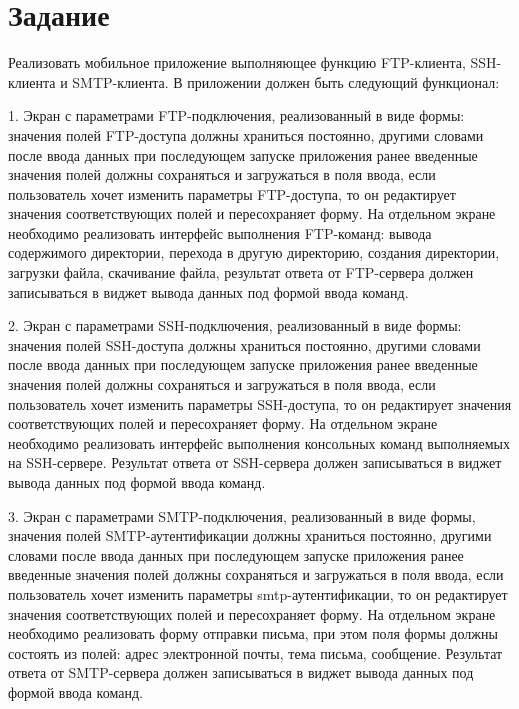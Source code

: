 \documentclass[a4paper, 14pt]{extarticle}
\begin{document}
\renewcommand{\ttdefault}{pcr}

\setlength{\tabcolsep}{3pt}
\newpage
\setcounter{page}{2}

\section{Задание}\label{Sect::task}

Реализовать мобильное приложение выполняющее функцию FTP-клиента,  SSH-клиента и SMTP-клиента.  В приложении должен быть следующий функционал:

1. Экран с параметрами FTP-подключения, реализованный в виде формы: значения полей FTP-доступа должны храниться постоянно, другими словами после ввода данных при последующем запуске приложения ранее введенные значения полей должны сохраняться и загружаться в поля ввода, если пользователь хочет изменить параметры FTP-доступа, то он редактирует значения соответствующих полей и пересохраняет форму. На отдельном экране необходимо реализовать интерфейс выполнения FTP-команд: вывода содержимого директории, перехода в другую директорию, создания директории, загрузки файла, скачивание файла, результат ответа от FTP-сервера должен записываться в виджет вывода данных под формой ввода команд.

2. Экран с параметрами SSH-подключения, реализованный в виде формы: значения полей SSH-доступа должны храниться постоянно, другими словами после ввода данных при последующем запуске приложения ранее введенные значения полей должны сохраняться и загружаться в поля ввода, если пользователь хочет изменить параметры SSH-доступа, то он редактирует значения соответствующих полей и пересохраняет форму. На отдельном экране необходимо реализовать интерфейс выполнения консольных команд выполняемых на SSH-сервере. Результат ответа от SSH-сервера должен записываться в виджет вывода данных под формой ввода команд.

3. Экран с параметрами SMTP-подключения, реализованный в виде формы, значения полей SMTP-аутентификации должны храниться постоянно, другими словами после ввода данных при последующем запуске приложения ранее введенные значения полей должны сохраняться и загружаться в поля ввода, если пользователь хочет изменить параметры smtp-аутентификации, то он редактирует значения соответствующих полей и пересохраняет форму. На отдельном экране необходимо реализовать форму отправки письма, при этом поля формы должны состоять из полей: адрес электронной почты, тема письма, сообщение. Результат ответа от SMTP-сервера должен записываться в виджет вывода данных под формой ввода команд.
\end{document}
